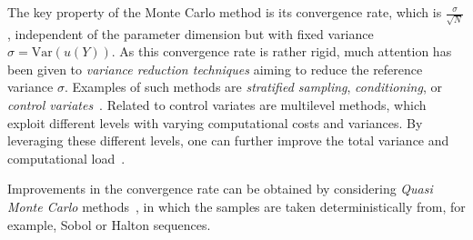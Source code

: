 The key property of the Monte Carlo method is its convergence rate, which is $\frac{\sigma}{\sqrt {N}}$, independent of the parameter dimension but with fixed variance $\sigma=\text{Var}(u(Y))$.
As this convergence rate is rather rigid, much attention has been given to \emph{variance reduction techniques} aiming to reduce the reference variance $\sigma$.
Examples of such methods are \emph{stratified sampling}, \emph{conditioning}, or \emph{control variates}~\cite{barbu2020}.
Related to control variates are multilevel methods, which exploit different levels with varying computational costs and variances.
By leveraging these different levels, one can further improve the total variance and computational load~\cite {giles2015}.

Improvements in the convergence rate can be obtained by considering \emph{Quasi Monte Carlo} methods~\cite{sobol1990}, in which the samples are taken deterministically from, for example, Sobol or Halton sequences.